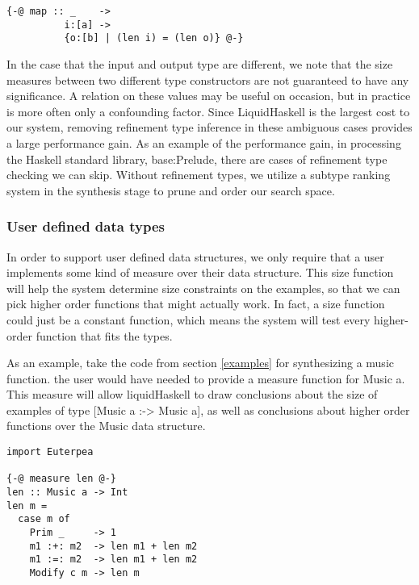 \begin{lstlisting}
{-@ map :: _    ->
          i:[a] ->
          {o:[b] | (len i) = (len o)} @-}
\end{lstlisting}

In the case that the input and output type are different, we note that the size measures between two different type constructors are not guaranteed to have any significance.
A relation on these values may be useful on occasion, but in practice is more often only a confounding factor.
Since LiquidHaskell is the largest cost to our system, removing refinement type inference in these ambiguous cases provides a large performance gain.
As an example of the performance gain, in processing the Haskell standard library, base:Prelude, there are  cases of refinement type checking we can skip.
Without refinement types, we utilize a subtype ranking system in the synthesis stage to prune and order our search space.


\subsubsection{User defined data types}
In order to support user defined data structures, we only require that a user implements some kind of measure\cite{realWorldLiquid} over their data structure.
This size function will help the system determine size constraints on the examples, so that we can pick higher order functions that might actually work.
In fact, a size function could just be a constant function, which means the system will test every higher-order function that fits the types. 

As an example, take the code from section \ref{examples} for synthesizing a music function.
the user would have needed to provide a measure function for Music a.
This measure will allow liquidHaskell to draw conclusions about the size of examples of type [Music a :-> Music a], as well as conclusions about higher order functions over the Music data structure.

\begin{lstlisting}
import Euterpea

{-@ measure len @-}
len :: Music a -> Int
len m =
  case m of
    Prim _     -> 1
    m1 :+: m2  -> len m1 + len m2
    m1 :=: m2  -> len m1 + len m2
    Modify c m -> len m
\end{lstlisting}



